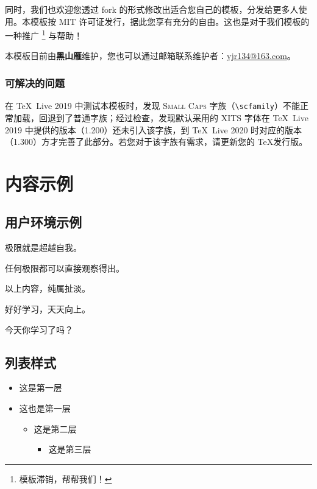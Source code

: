 \documentclass[
  10pt,
  twoside,
  openany,
  b5paper, %
  colorscheme = basic %
]{qyxf-book}
\begin{document}
同时，我们也欢迎您透过 fork 的形式修改出适合您自己的模板，分发给更多人使用。本模板按 MIT 许可证发行，据此您享有充分的自由。这也是对于我们模板的一种推广
\footnote{模板滞销，帮帮我们！}
与帮助！

本模板目前由\textbf{黑山雁}维护，您也可以通过邮箱联系维护者：\url{yjr134@163.com}。

\subsection{可解决的问题}

在 \TeX\ Live 2019 中测试本模板时，发现 \textsc{Small Caps} 字族（\verb|\scfamily|）不能正常加载，回退到了普通字族；经过检查，发现默认采用的 XITS 字体在 \TeX\ Live 2019 中提供的版本（1.200）还未引入该字族，到 \TeX\ Live 2020 时对应的版本（1.300）方才完善了此部分。若您对于该字族有需求，请更新您的 \TeX 发行版。

\chapter{内容示例}
\section{用户环境示例}

\begin{define}
  极限就是超越自我。
\end{define}

\begin{theorem}
  任何极限都可以直接观察得出。
\end{theorem}

\begin{lemma}
  以上内容，纯属扯淡。
\end{lemma}

\begin{note}
  好好学习，天天向上。
\end{note}

\begin{alert}
  今天你学习了吗？
\end{alert}

\section{列表样式}
\begin{itemize}
  \item 这是第一层
  \item 这也是第一层
  \begin{itemize}
    \item 这是第二层
    \begin{itemize}
      \item 这是第三层
    \end{itemize}
  \end{itemize}
\end{itemize}
\end{document}
